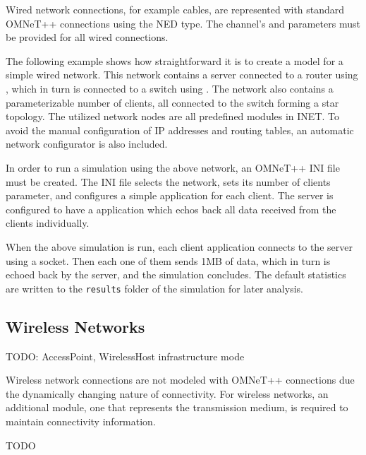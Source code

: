 Wired network connections, for example  cables, are
represented with standard OMNeT++ connections using the
 NED type. The channel's  and
 parameters must be provided for all wired connections.

The following example shows how straightforward it is to create a model for
a simple wired network. This network contains a server connected to a router
using , which in turn is connected to a switch using
. The network also contains a parameterizable number of
clients, all connected to the switch forming a star topology. The utilized
network nodes are all predefined modules in INET. To avoid the manual
configuration of IP addresses and routing tables, an automatic network
configurator is also included.


In order to run a simulation using the above network, an OMNeT++ INI file must
be created. The INI file selects the network, sets its number of clients
parameter, and configures a simple  application for each
client. The server is configured to have a  application which
echos back all data received from the clients individually.


When the above simulation is run, each client application connects to the
server using a  socket. Then each one of them sends 1MB of
data, which in turn is echoed back by the server, and the simulation
concludes. The default statistics are written to the \texttt{results}
folder of the simulation for later analysis.

\subsection{Wireless Networks}
\label{sec:networks:wireless-networks}

TODO: AccessPoint, WirelessHost infrastructure mode

Wireless network connections are not modeled with OMNeT++ connections due the
dynamically changing nature of connectivity. For wireless networks, an
additional module, one that represents the transmission medium, is required to
maintain connectivity information.

TODO 

